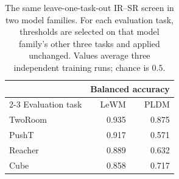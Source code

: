 \begin{table}[t]
\centering
\caption{The same leave-one-task-out IR--SR screen in two model families. For each evaluation task, thresholds are selected on that model family's other three tasks and applied unchanged. Values average three independent training runs; chance is $0.5$.}
\label{tab:pldm-architecture-portability}
\small
\setlength{\tabcolsep}{6pt}
\begin{tabular}{lrr}
\toprule
 & \multicolumn{2}{c}{Balanced accuracy} \\
\cmidrule(lr){2-3}
Evaluation task & LeWM & PLDM \\
\midrule
TwoRoom & 0.935 & 0.875 \\
PushT & 0.917 & 0.571 \\
Reacher & 0.889 & 0.632 \\
Cube & 0.858 & 0.717 \\
\bottomrule
\end{tabular}
\end{table}
